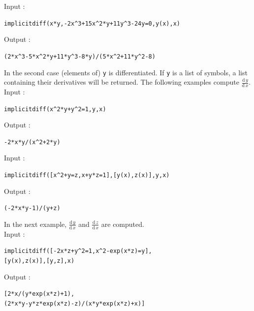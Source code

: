 \documentclass[a4paper,11pt]{book}
\begin{document}
\noindent Input :
\begin{center}
{\tt implicitdiff(x*y,-2x\verb|^|3+15x\verb|^|2*y+11y\verb|^|3-24y=0,y(x),x)}
\end{center}
Output :
\begin{center}
{\tt (2*x\verb|^|3-5*x\verb|^|2*y+11*y\verb|^|3-8*y)/(5*x\verb|^|2+11*y\verb|^|2-8)}
\end{center}
In the second case (elements of) {\tt y} is differentiated. If {\tt y} is a list of symbols, a list containing their derivatives will be returned. The following examples compute $ \frac{\mathrm{d}\,y}{\mathrm{d}\,x} $.\\
Input :
\begin{center}
{\tt implicitdiff(x\verb|^|2*y+y\verb|^|2=1,y,x)}
\end{center}
Output :
\begin{center}
{\tt -2*x*y/(x\verb|^|2+2*y)}
\end{center}
Input :
\begin{center}
{\tt implicitdiff([x\verb|^|2+y=z,x+y*z=1],[y(x),z(x)],y,x)}
\end{center}
Output :
\begin{center}
{\tt (-2*x*y-1)/(y+z)}
\end{center}
In the next example, $ \frac{\mathrm{d}\,y}{\mathrm{d}\,x} $ and $ \frac{\mathrm{d}\,z}{\mathrm{d}\,x} $ are computed.\\
Input :
\begin{center}
{\tt implicitdiff([-2x*z+y\verb|^|2=1,x\verb|^|2-exp(x*z)=y],}\\
{\tt [y(x),z(x)],[y,z],x)}
\end{center}
Output :
\begin{center}
{\tt [2*x/(y*exp(x*z)+1),}\\
{\tt (2*x*y-y*z*exp(x*z)-z)/(x*y*exp(x*z)+x)]}
\end{center}
\end{document}
